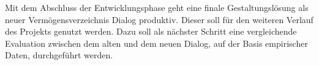 Mit dem Abschluss der Entwicklungsphase geht eine finale Gestaltungslösung als neuer Vermögensverzeichnis Dialog produktiv. Dieser soll für den weiteren Verlauf des Projekts genutzt werden. Dazu soll als nächster Schritt eine vergleichende Evaluation zwischen dem alten und dem neuen Dialog, auf der Basis empirischer Daten, durchgeführt werden.


